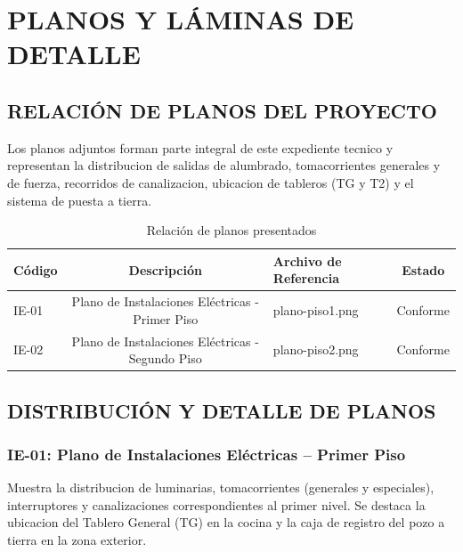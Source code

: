 \chapter*{PLANOS Y LÁMINAS DE DETALLE}

\setcounter{section}{0}
\renewcommand{\thesection}{7.\arabic{section}.}
\renewcommand{\thesubsection}{7.\arabic{section}.\arabic{subsection}.}
\renewcommand{\theHsection}{planos.\arabic{section}}
\renewcommand{\theHsubsection}{planos.\arabic{section}.\arabic{subsection}}

\section{RELACIÓN DE PLANOS DEL PROYECTO}

Los planos adjuntos forman parte integral de este expediente tecnico y representan la distribucion de salidas de alumbrado, tomacorrientes generales y de fuerza, recorridos de canalizacion, ubicacion de tableros (TG y T2) y el sistema de puesta a tierra.

\begin{table}[H]
\centering
\caption{Relación de planos presentados}
\label{tab:planos-relacion}
\begin{tabularx}{\textwidth}{L c L c}
\toprule
\textbf{Código} & \textbf{Descripción} & \textbf{Archivo de Referencia} & \textbf{Estado} \\
\midrule
IE-01 & Plano de Instalaciones Eléctricas - Primer Piso & plano-piso1.png & Conforme \\
IE-02 & Plano de Instalaciones Eléctricas - Segundo Piso & plano-piso2.png & Conforme \\
\bottomrule
\end{tabularx}
\end{table}

\section{DISTRIBUCIÓN Y DETALLE DE PLANOS}

\subsection{IE-01: Plano de Instalaciones Eléctricas -- Primer Piso}
Muestra la distribucion de luminarias, tomacorrientes (generales y especiales), interruptores y canalizaciones correspondientes al primer nivel. Se destaca la ubicacion del Tablero General (TG) en la cocina y la caja de registro del pozo a tierra en la zona exterior.

